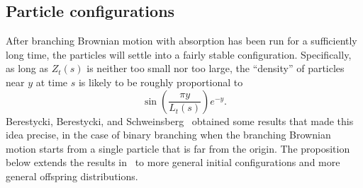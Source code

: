 \documentclass[10pt]{amsart}
\theoremstyle{definition}\newtheorem{defi}[theo]{Definition}\newtheorem{rema}[theo]{Remark}\newtheorem{exam}[theo]{Example}\newtheorem{exem}[theo]{Example}\newtheorem{nota}[theo]{Notation}
\newcommand{\1} {\mathds{1}}
\begin{document}
\subsection{Particle configurations}\label{sec:particle_configurations}

After branching Brownian motion with absorption has been run for a sufficiently long time, the particles will settle into a fairly stable configuration. Specifically, as long as $Z_t(s)$ is neither too small nor too large, the ``density'' of particles near $y$ at time $s$ is likely to be roughly proportional to
\begin{equation}\label{roughdensity}
\sin \left(\frac{\pi y}{L_t(s)} \right) e^{-y}.
\end{equation}
Berestycki, Berestycki, and Schweinsberg~\cite{bbs3} obtained some results that made this idea precise, in the case of binary branching when the branching Brownian motion starts from a single particle that is far from the origin. The proposition below extends the results in~\cite{bbs3} to more general initial configurations and more general offspring distributions.
\end{document}
